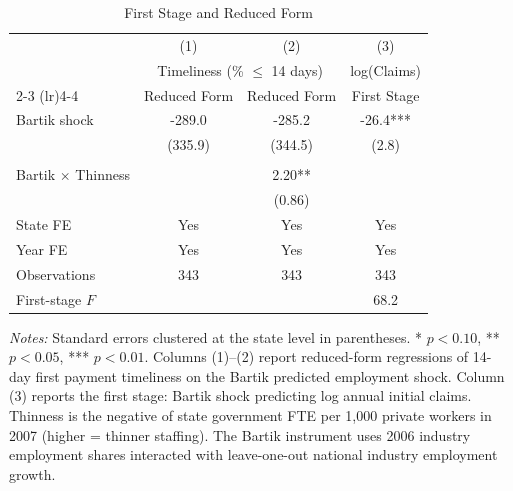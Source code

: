 \begin{table}[H]
\centering
\caption{First Stage and Reduced Form}
\begin{threeparttable}
\begin{tabular}{lccc}
\toprule
 & (1) & (2) & (3) \\
 & \multicolumn{2}{c}{Timeliness (\% $\leq$ 14 days)} & log(Claims) \\
\cmidrule(lr){2-3} \cmidrule(lr){4-4}
 & Reduced Form & Reduced Form & First Stage \\
\midrule
Bartik shock & -289.0 & -285.2 & -26.4*** \\
 & (335.9) & (344.5) & (2.8) \\
 & & & \\
Bartik $\times$ Thinness & & 2.20** & \\
 & & (0.86) & \\
\midrule
State FE & Yes & Yes & Yes \\
Year FE & Yes & Yes & Yes \\
Observations & 343 & 343 & 343 \\
First-stage $F$ & & & 68.2 \\
\bottomrule
\end{tabular}
\begin{tablenotes}[flushleft]
\small
\item \textit{Notes:} Standard errors clustered at the state level in parentheses. * $p<0.10$, ** $p<0.05$, *** $p<0.01$. Columns (1)--(2) report reduced-form regressions of 14-day first payment timeliness on the Bartik predicted employment shock. Column (3) reports the first stage: Bartik shock predicting log annual initial claims. Thinness is the negative of state government FTE per 1,000 private workers in 2007 (higher = thinner staffing). The Bartik instrument uses 2006 industry employment shares interacted with leave-one-out national industry employment growth.
\end{tablenotes}
\end{threeparttable}
\label{tab:firststage}
\end{table}

